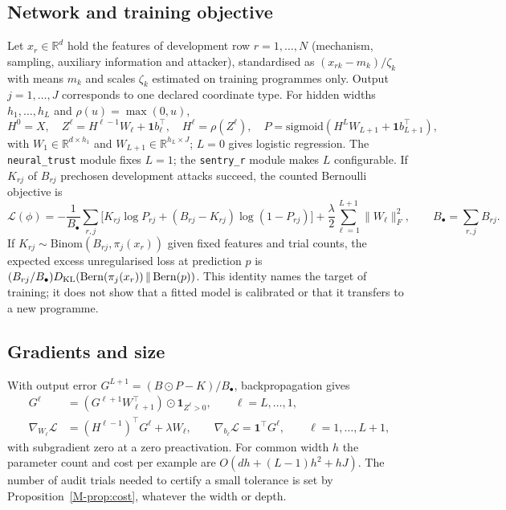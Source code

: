 \subsection{Network and training objective}
Let $x_r\in\mathbb R^d$ hold the features of development row $r=1,\ldots,N$ (mechanism, sampling, auxiliary information and attacker), standardised as $(x_{rk}-m_k)/\zeta_k$ with means $m_k$ and scales $\zeta_k$ estimated on training programmes only. Output $j=1,\ldots,J$ corresponds to one declared coordinate type. For hidden widths $h_1,\ldots,h_L$ and $\rho(u)=\max(0,u)$,
\begin{equation}\label{eq:net}
H^0=X,\quad Z^\ell=H^{\ell-1}W_\ell+\mathbf 1b_\ell^\top,\quad H^\ell=\rho(Z^\ell),\quad P=\mathrm{sigmoid}(H^LW_{L+1}+\mathbf 1b_{L+1}^\top),
\end{equation}
with $W_1\in\mathbb R^{d\times h_1}$ and $W_{L+1}\in\mathbb R^{h_L\times J}$; $L=0$ gives logistic regression. The \texttt{neural\_trust} module fixes $L=1$; the \texttt{sentry\_r} module makes $L$ configurable. If $K_{rj}$ of $B_{rj}$ prechosen development attacks succeed, the counted Bernoulli objective is
\begin{equation}\label{eq:loss}
\mathcal L(\phi)=-\frac1{B_\bullet}\sum_{r,j}\bigl[K_{rj}\log P_{rj}+(B_{rj}-K_{rj})\log(1-P_{rj})\bigr]+\frac\lambda2\sum_{\ell=1}^{L+1}\|W_\ell\|_F^2,\qquad B_\bullet=\sum_{r,j}B_{rj}.
\end{equation}
If $K_{rj}\sim\mathrm{Binom}(B_{rj},\pi_j(x_r))$ given fixed features and trial counts, the expected excess unregularised loss at prediction $p$ is $(B_{rj}/B_\bullet)D_{\rm KL}(\mathrm{Bern}(\pi_j(x_r))\,\|\,\mathrm{Bern}(p))$. This identity names the target of training; it does not show that a fitted model is calibrated or that it transfers to a new programme.

\subsection{Gradients and size}
With output error $G^{L+1}=(B\odot P-K)/B_\bullet$, backpropagation \cite{rumelhart1986} gives
\begin{align}\label{eq:gradient}
G^\ell&=(G^{\ell+1}W_{\ell+1}^\top)\odot\mathbf 1_{Z^\ell>0},\qquad\ell=L,\ldots,1,\\
\nabla_{W_\ell}\mathcal L&=(H^{\ell-1})^\top G^\ell+\lambda W_\ell,\qquad\nabla_{b_\ell}\mathcal L=\mathbf 1^\top G^\ell,\qquad\ell=1,\ldots,L+1,\nonumber
\end{align}
with subgradient zero at a zero preactivation. For common width $h$ the parameter count and cost per example are $O(dh+(L-1)h^2+hJ)$. The number of audit trials needed to certify a small tolerance is set by Proposition~\ref{M-prop:cost}, whatever the width or depth.

